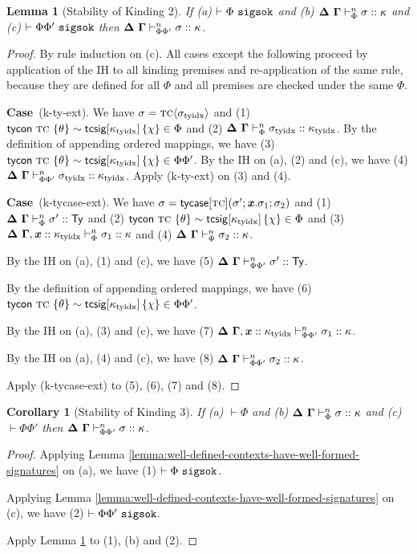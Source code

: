 \documentclass[12pt]{article}
\newtheorem{lemma}{Lemma}
\newtheorem{corollary}{Corollary}
\newcommand{\pfcase}[1]{\textbf{Case}~#1. }
\begin{document}
\begin{lemma}[Stability of Kinding 2]
\label{lemma:stability-of-kinding-2}
If (a) $\vdash \Phi~\mathtt{sigsok}$ and (b) $\boldsymbol\Delta~\boldsymbol\Gamma \vdash_{\Phi}^{n} \sigma :: \kappa$ and (c) $\vdash \Phi\Phi'~\mathtt{sigsok}$  then $\boldsymbol\Delta~\boldsymbol\Gamma \vdash_{\Phi\Phi'}^{n} \sigma :: \kappa$.
\end{lemma}
\begin{proof} By rule induction on (c). All cases except the following proceed by  application of the IH to all kinding premises and re-application of the same rule, because they are defined for all $\Phi$ and all premises are checked under the same $\Phi$.

\pfcase{(k-ty-ext)} We have $\sigma={\textsc{tc}}\langle\sigma_\text{tyidx}\rangle$ and (1) ${\sf tycon}~\textsc{tc} ~\{\theta\} \sim {\sf tcsig}[\kappa_\text{tyidx}]\,\{\chi\} \in \Phi$ and (2) $\boldsymbol\Delta~\boldsymbol\Gamma \vdash_{\Phi}^{n} \sigma_\text{tyidx} :: \kappa_\text{tyidx}$. By the definition of appending ordered mappings, we have (3) ${\sf tycon}~\textsc{tc} ~\{\theta\} \sim {\sf tcsig}[\kappa_\text{tyidx}]\,\{\chi\} \in \Phi\Phi'$. By the IH on (a), (2) and (c), we have (4) $\boldsymbol\Delta~\boldsymbol\Gamma \vdash_{\Phi\Phi'}^{n} \sigma_\text{tyidx} :: \kappa_\text{tyidx}$. Apply (k-ty-ext) on (3) and (4). 

\pfcase{(k-tycase-ext)} We have $\sigma={\sf tycase}[\textsc{tc}](\sigma'; {\textbf{\textit{x}}}.\sigma_1; \sigma_2)$ and (1) $\boldsymbol\Delta~\boldsymbol\Gamma \vdash_{\Phi}^{n} \sigma' :: {\sf Ty}$ and (2) ${\sf tycon}~\textsc{tc} ~\{\theta\} \sim {\sf tcsig}[\kappa_\text{tyidx}]\,\{\chi\} \in \Phi$ and (3) $\boldsymbol\Delta~\boldsymbol\Gamma, {\textbf{\textit{x}}} :: \kappa_\text{tyidx} \vdash_{\Phi}^{n} \sigma_1 :: \kappa$ and (4) $\boldsymbol\Delta~\boldsymbol\Gamma \vdash_{\Phi}^{n} \sigma_2 :: \kappa$.

By the IH on (a), (1) and (c), we have (5) $\boldsymbol\Delta~\boldsymbol\Gamma \vdash_{\Phi\Phi'}^{n} \sigma' :: {\sf Ty}$.

By the definition of appending ordered mappings, we have (6) ${\sf tycon}~\textsc{tc} ~\{\theta\} \sim {\sf tcsig}[\kappa_\text{tyidx}]\,\{\chi\} \in \Phi\Phi'$. 

By the IH on (a), (3) and (c), we have (7)  $\boldsymbol\Delta~\boldsymbol\Gamma, {\textbf{\textit{x}}} :: \kappa_\text{tyidx} \vdash_{\Phi\Phi'}^{n} \sigma_1 :: \kappa$.

By the IH on (a), (4) and (c), we have (8) $\boldsymbol\Delta~\boldsymbol\Gamma \vdash_{\Phi\Phi'}^{n} \sigma_2 :: \kappa$.

Apply (k-tycase-ext) to (5), (6), (7) and (8). \end{proof}

\begin{corollary}[Stability of Kinding 3]
\label{lemma:stability-of-kinding-3}
If (a) $\vdash \Phi$ and (b) $\boldsymbol\Delta~\boldsymbol\Gamma \vdash_{\Phi}^{n} \sigma :: \kappa$ and (c) $\vdash \Phi\Phi'$ then $\boldsymbol\Delta~\boldsymbol\Gamma \vdash_{\Phi\Phi'}^{n} \sigma :: \kappa$.
\end{corollary}
\begin{proof}
Applying Lemma \ref{lemma:well-defined-contexts-have-well-formed-signatures} on (a), we have (1) $\vdash \Phi~\mathtt{sigsok}$.

Applying Lemma \ref{lemma:well-defined-contexts-have-well-formed-signatures} on (c), we have (2) $\vdash \Phi\Phi'~\mathtt{sigsok}$.

Apply Lemma \ref{lemma:stability-of-kinding-2} to (1), (b) and (2).
\end{proof}
\end{document}
